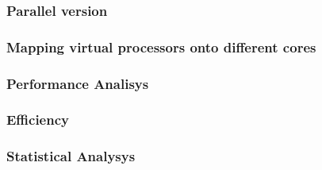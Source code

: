 %



%
%
%
%

\subsubsection{Parallel version}
\subsubsection{Mapping virtual processors onto different cores} 
\subsubsection{Performance Analisys} 
\subsubsection{Efficiency} 
\subsubsection{Statistical Analysys}